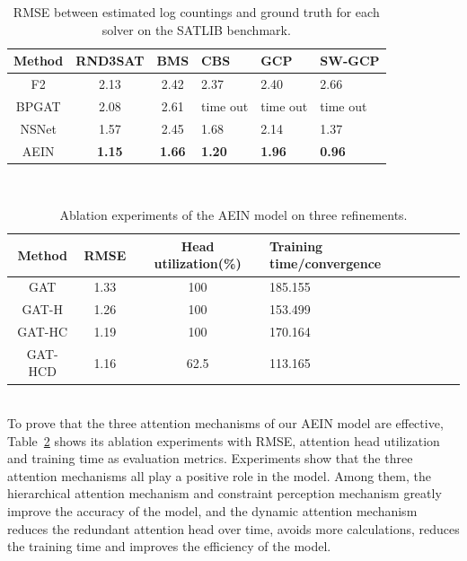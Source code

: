 \begin{table}[htbp] 
  \centering  
  \caption{RMSE between estimated log countings and ground truth for each solver on the SATLIB benchmark.}  
  \begin{tabular}{ccclll}  
    \toprule
    Method& RND3SAT& BMS & CBS& GCP&SW-GCP\\  
    \midrule
    F2& 2.13& 2.42& 2.37& 2.40&2.66\\ 
    BPGAT& 2.08& 2.61& time out& time out& time out&\\
    NSNet& 1.57& 2.45& 1.68& 2.14&1.37\\  
    AEIN& \textbf{1.15}& \textbf{1.66}& \textbf{1.20}& \textbf{1.96}&\textbf{0.96}\\  
    \bottomrule
  \end{tabular}
  \label{tab1}  
\end{table}\\
\begin{table}[htbp] 
  \centering  
  \caption{Ablation experiments of the AEIN model on three refinements.}  
  \begin{tabular}{ccclll}  
    \toprule
    Method& RMSE& Head utilization(\%)& Training time/convergence\\ 
    \midrule
    GAT& 1.33& 100& 185.155\\  
    GAT-H& 1.26& 100& 153.499\\  
    GAT-HC& 1.19& 100& 170.164\\
    \centering  
    GAT-HCD& 1.16& 62.5& 113.165\\  
    \bottomrule
  \end{tabular}
  \label{tab2}  
\end{table}\\
To prove that the three attention mechanisms of our AEIN model are effective, Table~\ref{tab2} shows its ablation experiments 
with RMSE, attention head utilization and training time as evaluation metrics. Experiments show that the three attention mechanisms 
all play a positive role in the model. Among them, the hierarchical attention mechanism and constraint perception mechanism greatly 
improve the accuracy of the model, and the dynamic attention mechanism reduces the redundant attention head over time, avoids more 
calculations, reduces the training time and improves the efficiency of the model.
